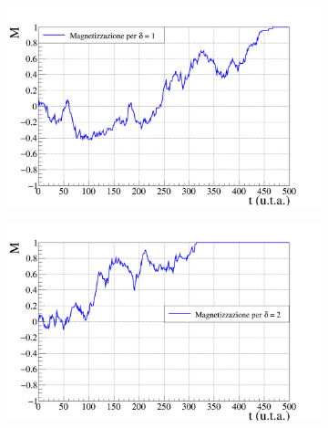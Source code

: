 \documentclass[letterpaper,10pt]{article}
\begin{document}
\begin{figure}[h]
\centering
\begin{subfigure}{0.8\textwidth}
\includegraphics[width=\linewidth]{Immagini/magn_graph_d1.png}
\end{subfigure}
\begin{subfigure}{0.8\textwidth}
\includegraphics[width=\linewidth]{Immagini/magn_graph_d2.png}
\end{subfigure}
\end{figure}
\end{document}
